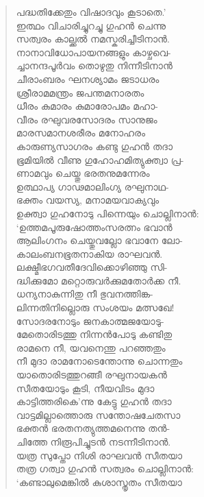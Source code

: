 \begin{verse}
പദ്ധതിക്കേതും വിഷാദവും കൂടാതെ.’\\
ഇത്ഥം വിചാരിച്ചുറച്ചു ഗുഹന്‍ ചെന്നു\\
സത്വരം കാല്ക്കല്‍ നമസ്കരിച്ചീടിനാന്‍.\\
നാനാവിധോപായനങ്ങളും കാഴ്ചവെ-\\
ച്ചാനന്ദപൂര്‍വം തൊഴുതു നിന്നീടിനാന്‍\\
ചീരാംബരം ഘനശ്യാമം ജടാധരം\\
ശ്രീരാമമന്ത്രം ജപന്തമനാരതം\\
ധീരം കുമാരം കുമാരോപമം മഹാ-\\
വീരം രഘുവരസോദരം സാനുജം\\
മാരസമാനശരീരം മനോഹരം\\
കാരുണ്യസാഗരം കണ്ടു ഗുഹന്‍ തദാ\\
ഭൂമിയില്‍ വീണു ഗുഹോഹമിത്യുക്ത്വാ പ്ര-\\
ണാമവും ചെയ്തു ഭരതനുമന്നേരം\\
ഉത്ഥാപ്യ ഗാഢമാലിംഗ്യ രഘുനാഥ-\\
ഭക്തം വയസ്യ, മനാമയവാക്യവും\\
ഉക്ത്വാ ഗുഹനോടു പിന്നെയും ചൊല്ലിനാന്‍:\\
‘ഉത്തമപൂരുഷോത്തംസരത്നം ഭവാന്‍\\
ആലിംഗനം ചെയ്തുവല്ലോ ഭവാനേ ലോ-\\
കാലംബനഭൂതനാകിയ രാഘവന്‍.\\
ലക്ഷ്മീഭഗവതീദേവിക്കൊഴിഞ്ഞു സി-\\
ദ്ധിക്കുമോ മറ്റൊരുവര്‍ക്കുമതോര്‍ക്ക നീ.\\
ധന്യനാകുന്നിതു നീ ഭുവനത്തിങ്ക-\\
ലിന്നതിനില്ലൊരു സംശയം മത്സഖേ!\\
സോദരനോടും ജനകാത്മജയോടു-\\
മേതൊരിടത്തു നിന്നന്‍പോടു കണ്ടിതു\\
രാമനെ നീ, യവനെന്തു പറഞ്ഞതും\\
നീ മുദാ രാമനോടെന്തോന്നു ചൊന്നതും\\
യാതൊരിടത്തുറങ്ങീ രഘുനായകന്‍\\
സീതയോടും കൂടി, നീയവിടം മുദാ\\
കാട്ടിത്തരികെ’ന്നു കേട്ടു ഗുഹന്‍ തദാ\\
വാട്ടമില്ലാത്തൊരു സന്തോഷചേതസാ\\
ഭക്തന്‍ ഭരതനത്യുത്തമനെന്നു തന്‍-\\
ചിത്തേ നിരൂപിച്ചുടന്‍ നടന്നീടിനാന്‍.\\
യത്ര സുപ്തോ നിശി രാഘവന്‍ സീതയാ\\
തത്ര ഗത്വാ ഗുഹന്‍ സത്വരം ചൊല്ലിനാന്‍:\\
‘കണ്ടാലുമെങ്കില്‍ കുശാസ്തൃതം സീതയാ\\

\end{verse}
